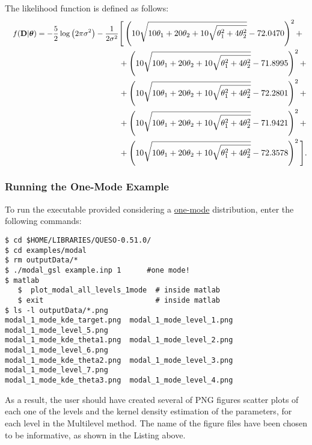 The likelihood function is defined as follows:
\begin{equation}
\begin{split} \small
\quad f({\bf D}|\mbox{\boldmath$ \theta $})= -\dfrac{5}{2} \log\left(2 \pi \sigma^2\right)-\dfrac{1}{2\sigma^2} &\Bigg[
 \left(10 \sqrt{10 \theta_1+20 \theta_2+10 \sqrt{\theta_1^2+4 \theta_2^2}}-72.0470\right)^2 +\\
&+\left(10 \sqrt{10 \theta_1+20 \theta_2+10 \sqrt{\theta_1^2+4 \theta_2^2}}-71.8995\right)^2 +\\
&+\left(10 \sqrt{10 \theta_1+20 \theta_2+10 \sqrt{\theta_1^2+4 \theta_2^2}}-72.2801\right)^2 +\\
&+\left(10 \sqrt{10 \theta_1+20 \theta_2+10 \sqrt{\theta_1^2+4 \theta_2^2}}-71.9421\right)^2 +\\
&+\left(10 \sqrt{10 \theta_1+20 \theta_2+10 \sqrt{\theta_1^2+4 \theta_2^2}}-72.3578\right)^2 \Bigg].
\end{split}
\end{equation}

\subsubsection{Running the One-Mode Example}
 
To run the executable provided considering a \underline{one-mode} distribution, enter the following commands:
\begin{lstlisting}[label={},caption={Running the example with a one-mode distribution.}]
$ cd $HOME/LIBRARIES/QUESO-0.51.0/
$ cd examples/modal
$ rm outputData/*
$ ./modal_gsl example.inp 1      #one mode!
$ matlab
   $  plot_modal_all_levels_1mode  # inside matlab
   $ exit                          # inside matlab
$ ls -l outputData/*.png
modal_1_mode_kde_target.png  modal_1_mode_level_1.png  modal_1_mode_level_5.png
modal_1_mode_kde_theta1.png  modal_1_mode_level_2.png  modal_1_mode_level_6.png
modal_1_mode_kde_theta2.png  modal_1_mode_level_3.png  modal_1_mode_level_7.png
modal_1_mode_kde_theta3.png  modal_1_mode_level_4.png
\end{lstlisting}

As a result, the user should have created several of PNG figures scatter plots of each one of the levels and the kernel density estimation of the parameters, for each level in the Multilevel method. The name of the figure files have been chosen to be informative, as shown in the Listing above. 



